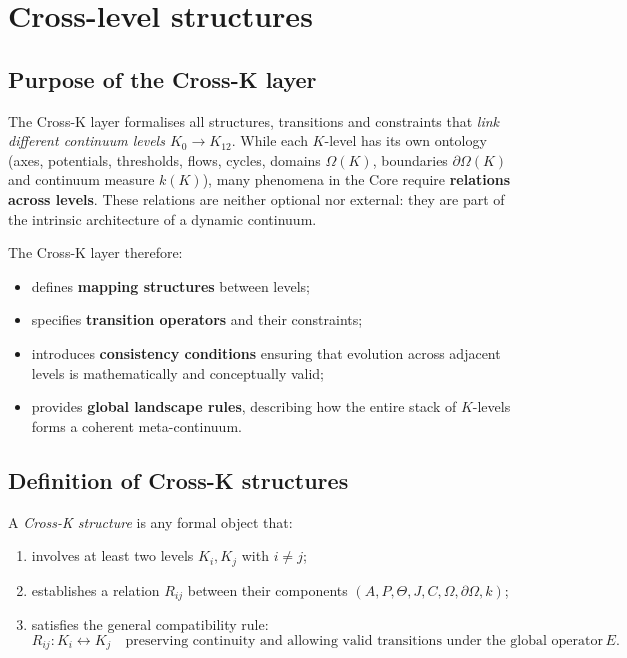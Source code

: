 
\section{Cross-level structures}
\label{sec:crossk_master}

\subsection{Purpose of the Cross-K layer}
The Cross-K layer formalises all structures, transitions and constraints
that \emph{link different continuum levels $K_0 \rightarrow K_{12}$}.  
While each $K$-level has its own ontology (axes, potentials, thresholds,
flows, cycles, domains $\Omega(K)$, boundaries $\partial\Omega(K)$ and
continuum measure $k(K)$), many phenomena in the Core require
\textbf{relations across levels}. These relations are neither optional
nor external: they are part of the intrinsic architecture of a dynamic
continuum.

The Cross-K layer therefore:
\begin{itemize}
  \item defines \textbf{mapping structures} between levels;
  \item specifies \textbf{transition operators} and their constraints;
  \item introduces \textbf{consistency conditions} ensuring that evolution
        across adjacent levels is mathematically and conceptually valid;
  \item provides \textbf{global landscape rules}, describing how the entire
        stack of $K$-levels forms a coherent meta-continuum.
\end{itemize}

\subsection{Definition of Cross-K structures}
A \emph{Cross-K structure} is any formal object that:
\begin{enumerate}
  \item involves at least two levels $K_i, K_j$ with $i \neq j$;
  \item establishes a relation $R_{ij}$ between their components
        $(A,P,\Theta,J,C,\Omega,\partial\Omega,k)$;
  \item satisfies the general compatibility rule:
        \[
        R_{ij} : K_i \leftrightarrow K_j \quad \text{preserving continuity and
        allowing valid transitions under the global operator } E.
        \]
\end{enumerate}

